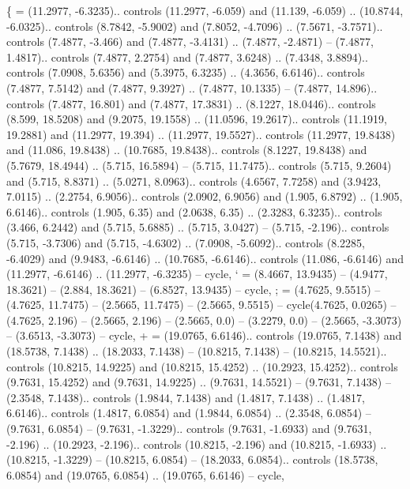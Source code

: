 {\{} = {(11.2977, -6.3235).. controls (11.2977, -6.059) and (11.139, -6.059) .. (10.8744, -6.0325).. controls (8.7842, -5.9002) and (7.8052, -4.7096) .. (7.5671, -3.7571).. controls (7.4877, -3.466) and (7.4877, -3.4131) .. (7.4877, -2.4871) -- (7.4877, 1.4817).. controls (7.4877, 2.2754) and (7.4877, 3.6248) .. (7.4348, 3.8894).. controls (7.0908, 5.6356) and (5.3975, 6.3235) .. (4.3656, 6.6146).. controls (7.4877, 7.5142) and (7.4877, 9.3927) .. (7.4877, 10.1335) -- (7.4877, 14.896).. controls (7.4877, 16.801) and (7.4877, 17.3831) .. (8.1227, 18.0446).. controls (8.599, 18.5208) and (9.2075, 19.1558) .. (11.0596, 19.2617).. controls (11.1919, 19.2881) and (11.2977, 19.394) .. (11.2977, 19.5527).. controls (11.2977, 19.8438) and (11.086, 19.8438) .. (10.7685, 19.8438).. controls (8.1227, 19.8438) and (5.7679, 18.4944) .. (5.715, 16.5894) -- (5.715, 11.7475).. controls (5.715, 9.2604) and (5.715, 8.8371) .. (5.0271, 8.0963).. controls (4.6567, 7.7258) and (3.9423, 7.0115) .. (2.2754, 6.9056).. controls (2.0902, 6.9056) and (1.905, 6.8792) .. (1.905, 6.6146).. controls (1.905, 6.35) and (2.0638, 6.35) .. (2.3283, 6.3235).. controls (3.466, 6.2442) and (5.715, 5.6885) .. (5.715, 3.0427) -- (5.715, -2.196).. controls (5.715, -3.7306) and (5.715, -4.6302) .. (7.0908, -5.6092).. controls (8.2285, -6.4029) and (9.9483, -6.6146) .. (10.7685, -6.6146).. controls (11.086, -6.6146) and (11.2977, -6.6146) .. (11.2977, -6.3235) -- cycle},
{`} = {(8.4667, 13.9435) -- (4.9477, 18.3621) -- (2.884, 18.3621) -- (6.8527, 13.9435) -- cycle},
{;} = {(4.7625, 9.5515) -- (4.7625, 11.7475) -- (2.5665, 11.7475) -- (2.5665, 9.5515) -- cycle(4.7625, 0.0265) -- (4.7625, 2.196) -- (2.5665, 2.196) -- (2.5665, 0.0) -- (3.2279, 0.0) -- (2.5665, -3.3073) -- (3.6513, -3.3073) -- cycle},
{+} = {(19.0765, 6.6146).. controls (19.0765, 7.1438) and (18.5738, 7.1438) .. (18.2033, 7.1438) -- (10.8215, 7.1438) -- (10.8215, 14.5521).. controls (10.8215, 14.9225) and (10.8215, 15.4252) .. (10.2923, 15.4252).. controls (9.7631, 15.4252) and (9.7631, 14.9225) .. (9.7631, 14.5521) -- (9.7631, 7.1438) -- (2.3548, 7.1438).. controls (1.9844, 7.1438) and (1.4817, 7.1438) .. (1.4817, 6.6146).. controls (1.4817, 6.0854) and (1.9844, 6.0854) .. (2.3548, 6.0854) -- (9.7631, 6.0854) -- (9.7631, -1.3229).. controls (9.7631, -1.6933) and (9.7631, -2.196) .. (10.2923, -2.196).. controls (10.8215, -2.196) and (10.8215, -1.6933) .. (10.8215, -1.3229) -- (10.8215, 6.0854) -- (18.2033, 6.0854).. controls (18.5738, 6.0854) and (19.0765, 6.0854) .. (19.0765, 6.6146) -- cycle},

